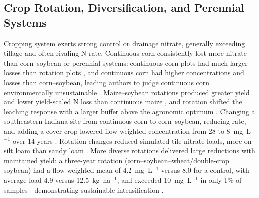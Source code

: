 \subsection{Crop Rotation, Diversification, and Perennial Systems}

Cropping system exerts strong control on drainage nitrate, generally exceeding tillage and often rivaling N rate. Continuous corn consistently lost more nitrate than corn--soybean or perennial systems: continuous-corn plots had much larger losses than rotation plots \parencite{Weed1996}, and continuous corn had higher concentrations and losses than corn--soybean, leading authors to judge continuous corn environmentally unsustainable \parencite{Kanwar1997}. Maize--soybean rotations produced greater yield and lower yield-scaled N loss than continuous maize \parencite{Zhao2016}, and rotation shifted the leaching response with a larger buffer above the agronomic optimum \parencite{Pasley2021}. Changing a southeastern Indiana site from continuous corn to corn--soybean, reducing rate, and adding a cover crop lowered flow-weighted concentration from 28 to 8~mg~L$^{-1}$ over 14 years \parencite{Ritter2015}. Rotation changes reduced simulated tile nitrate loads, more on silt loam than sandy loam \parencite{Ahmed2007b}. More diverse rotations delivered large reductions with maintained yield: a three-year rotation (corn--soybean--wheat/double-crop soybean) had a flow-weighted mean of 4.2~mg~L$^{-1}$ versus 8.0 for a control, with average load 4.9 versus 12.5~kg~ha$^{-1}$, and exceeded 10~mg~L$^{-1}$ in only 1\% of samples---demonstrating sustainable intensification \parencite{Gentry2025}.

